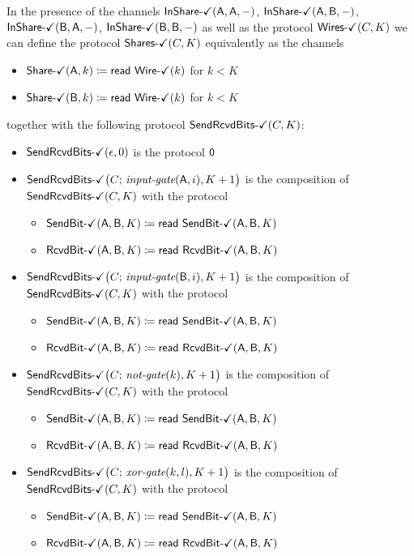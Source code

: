 \noindent In the presence of the channels $\InShareOk(\A,\A,-)$, $\InShareOk(\A,\B,-)$, $\InShareOk(\B,\A,-)$, $\InShareOk(\B,\B,-)$ as well as the protocol $\WiresOk(C,K)$ we can define the protocol $\SharesOk(C,K)$ equivalently as the channels
\begin{itemize}
\item {\color{teal} $\ShareOk(\A,k) \coloneqq \read{\WireOk(k)}$ for $k < K$}
\item {\color{teal} $\ShareOk(\B,k) \coloneqq \read{\WireOk(k)}$ for $k < K$}
\end{itemize}
together with the following protocol $\SendRcvdBitsOk(C,K)$:

\begin{itemize}
\item $\SendRcvdBitsOk(\epsilon,0)$ is the protocol $\zero$

\item $\SendRcvdBitsOk\big(C; \, \inputgate(\A,i),K+1\big)$ is the composition of $\SendRcvdBitsOk(C,K)$ with the protocol
\begin{itemize}
\item {\color{teal} $\SendBitOk(\A,\B,K) \coloneqq \read{\SendBitOk(\A,\B,K)}$}
\item {\color{teal} $\RcvdBitOk(\A,\B,K) \coloneqq \read{\RcvdBitOk(\A,\B,K)}$}
\end{itemize}

\item $\SendRcvdBitsOk\big(C; \, \inputgate(\B,i),K+1\big)$ is the composition of $\SendRcvdBitsOk(C,K)$ with the protocol
\begin{itemize}
\item {\color{teal} $\SendBitOk(\A,\B,K) \coloneqq \read{\SendBitOk(\A,\B,K)}$}
\item {\color{teal} $\RcvdBitOk(\A,\B,K) \coloneqq \read{\RcvdBitOk(\A,\B,K)}$}
\end{itemize}

\item $\SendRcvdBitsOk\big(C; \, \notgate(k),K+1\big)$ is the composition of $\SendRcvdBitsOk(C,K)$ with the protocol
\begin{itemize}
\item {\color{teal} $\SendBitOk(\A,\B,K) \coloneqq \read{\SendBitOk(\A,\B,K)}$}
\item {\color{teal} $\RcvdBitOk(\A,\B,K) \coloneqq \read{\RcvdBitOk(\A,\B,K)}$}
\end{itemize}

\item $\SendRcvdBitsOk\big(C; \, \xorgate(k,l),K+1\big)$ is the composition of $\SendRcvdBitsOk(C,K)$ with the protocol
\begin{itemize}
\item {\color{teal} $\SendBitOk(\A,\B,K) \coloneqq \read{\SendBitOk(\A,\B,K)}$}
\item {\color{teal} $\RcvdBitOk(\A,\B,K) \coloneqq \read{\RcvdBitOk(\A,\B,K)}$}
\end{itemize}


\end{itemize}
